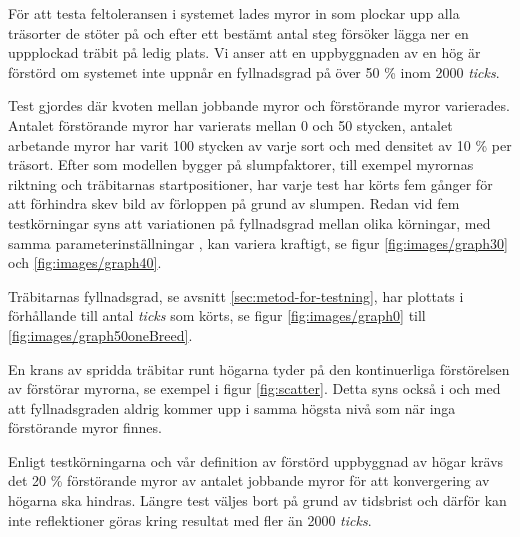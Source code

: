 \documentclass[titlepage, a4paper, 12pt]{article}
\begin{document}
För att testa feltoleransen i systemet lades myror in som plockar upp
alla träsorter de stöter på och efter ett bestämt antal steg försöker
lägga ner en uppplockad träbit på ledig plats. Vi anser att en
uppbyggnaden av en hög är förstörd om systemet inte uppnår en
fyllnadsgrad på över 50 \% inom 2000 \textit{ticks}.

Test gjordes där kvoten mellan jobbande myror och förstörande myror
varierades. Antalet förstörande myror har varierats mellan 0 och 50
stycken, antalet arbetande myror har varit 100 stycken av varje sort
och med densitet av 10 \% per träsort. Efter som modellen bygger på
slumpfaktorer, till exempel myrornas riktning och träbitarnas
startpositioner, har varje test har körts fem gånger för att förhindra
skev bild av förloppen på grund av slumpen. Redan vid fem
testkörningar syns att variationen på fyllnadsgrad mellan olika
körningar, med samma parameterinställningar , kan variera kraftigt, se
figur \ref{fig:images/graph30} och \ref{fig:images/graph40}.

Träbitarnas fyllnadsgrad, se avsnitt \ref{sec:metod-for-testning}, har
plottats i förhållande till antal \textit{ticks} som körts, se figur
\ref{fig:images/graph0} till \ref{fig:images/graph50oneBreed}.

En krans av spridda träbitar runt högarna tyder på den kontinuerliga
förstörelsen av förstörar myrorna, se exempel i figur
\ref{fig:scatter}. Detta syns också i och med att fyllnadsgraden
aldrig kommer upp i samma högsta nivå som när inga förstörande myror
finnes.

Enligt testkörningarna och vår definition av förstörd uppbyggnad av
högar krävs det 20 \% förstörande myror av antalet jobbande myror för
att konvergering av högarna ska hindras. Längre test väljes bort på
grund av tidsbrist och därför kan inte reflektioner göras kring
resultat med fler än 2000 \textit{ticks}.
\end{document}
